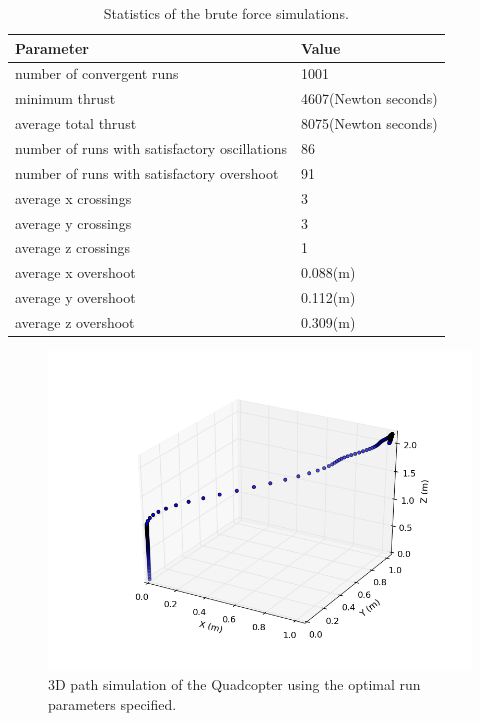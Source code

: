 \begin{table}
\label{table:bruteforcestatistics}
\begin{doublespace}
\centering
\begin{tabular}{l l}
Parameter    & Value\\
\hline
number of convergent runs &  1001\\
minimum thrust &  4607(Newton seconds)\\
average total thrust &  8075(Newton seconds)\\
number of runs with satisfactory oscillations &   86\\
number of runs with satisfactory overshoot & 91\\
average x crossings &  3\\
average y crossings &  3\\
average z crossings &  1\\
average x overshoot &  0.088(m)\\
average y overshoot &  0.112(m)\\
average z overshoot &  0.309(m)\\

\hline
\end{tabular}
\end{doublespace}

\caption[Statistics of the brute force simulations.]{Statistics of the brute force simulations.}
\end{table}
\begin{figure}[htbp]
	\centering
		\includegraphics[width=\textwidth]{Figures/optimal_run_3D_path.png}
	\caption[3D path simulation of the Quadcopter using the optimal run parameters specified.]{3D path simulation of the Quadcopter using the optimal run parameters specified.}
	\label{fig:optimal run 3D path}
\end{figure}
